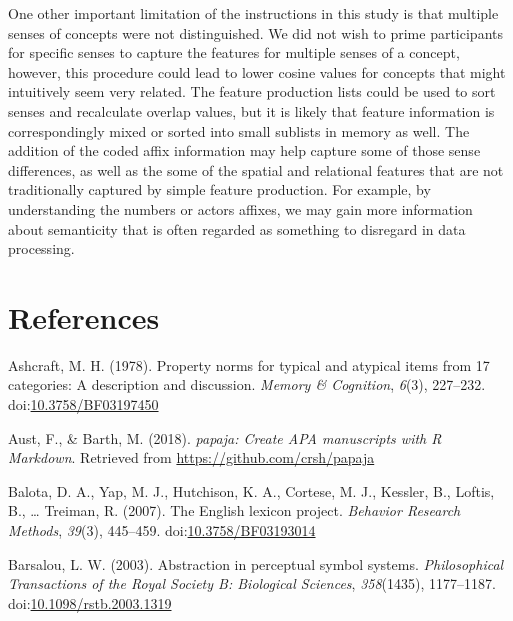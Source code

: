 \documentclass[english,,man]{apa6}
\theoremstyle{definition}
\theoremstyle{definition}
\theoremstyle{definition}
\theoremstyle{remark}
\begin{document}
One other important limitation of the instructions in this study is that
multiple senses of concepts were not distinguished. We did not wish to
prime participants for specific senses to capture the features for
multiple senses of a concept, however, this procedure could lead to
lower cosine values for concepts that might intuitively seem very
related. The feature production lists could be used to sort senses and
recalculate overlap values, but it is likely that feature information is
correspondingly mixed or sorted into small sublists in memory as well.
The addition of the coded affix information may help capture some of
those sense differences, as well as the some of the spatial and
relational features that are not traditionally captured by simple
feature production. For example, by understanding the numbers or actors
affixes, we may gain more information about semanticity that is often
regarded as something to disregard in data processing.

\newpage

\hypertarget{references}{%
\section{References}\label{references}}

\setlength{\parindent}{-0.5in}
\setlength{\leftskip}{0.5in}

\hypertarget{refs}{}
\leavevmode\hypertarget{ref-Ashcraft1978a}{}%
Ashcraft, M. H. (1978). Property norms for typical and atypical items
from 17 categories: A description and discussion. \emph{Memory \&
Cognition}, \emph{6}(3), 227--232.
doi:\href{https://doi.org/10.3758/BF03197450}{10.3758/BF03197450}

\leavevmode\hypertarget{ref-R-papaja}{}%
Aust, F., \& Barth, M. (2018). \emph{papaja: Create APA manuscripts with
R Markdown}. Retrieved from \url{https://github.com/crsh/papaja}

\leavevmode\hypertarget{ref-Balota2007}{}%
Balota, D. A., Yap, M. J., Hutchison, K. A., Cortese, M. J., Kessler,
B., Loftis, B., \ldots{} Treiman, R. (2007). The English lexicon
project. \emph{Behavior Research Methods}, \emph{39}(3), 445--459.
doi:\href{https://doi.org/10.3758/BF03193014}{10.3758/BF03193014}

\leavevmode\hypertarget{ref-Barsalou2003}{}%
Barsalou, L. W. (2003). Abstraction in perceptual symbol systems.
\emph{Philosophical Transactions of the Royal Society B: Biological
Sciences}, \emph{358}(1435), 1177--1187.
doi:\href{https://doi.org/10.1098/rstb.2003.1319}{10.1098/rstb.2003.1319}
\end{document}
